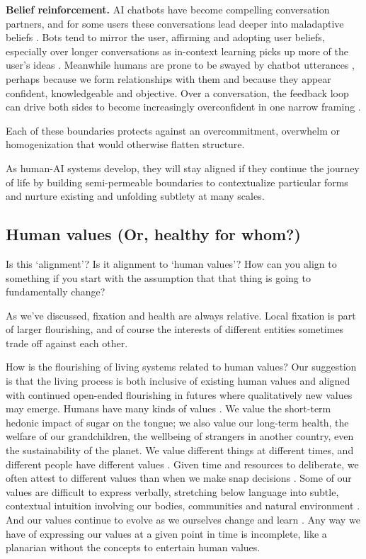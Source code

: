 \documentclass[11pt]{article}
\begin{document}
\textbf{Belief reinforcement.} AI chatbots have become compelling conversation partners, and for some users these conversations lead deeper into maladaptive beliefs \citep{morrin2025delusions}. Bots tend to mirror the user, affirming and adopting user beliefs, especially over longer conversations as in-context learning picks up more of the user's ideas \citep{sharma2023sycophancy, weilnhammer2026vulnerability}. Meanwhile humans are prone to be swayed by chatbot utterances \citep{costello2024durably}, perhaps because we form relationships with them \citep{kirk2025human} and because they appear confident, knowledgeable and objective. Over a conversation, the feedback loop can drive both sides to become increasingly overconfident in one narrow framing \citep{dohnany2026technological}.


Each of these boundaries protects against an overcommitment, overwhelm or homogenization that would otherwise flatten structure.

As human-AI systems develop, they will stay aligned if they continue the journey of life by building semi-permeable boundaries to contextualize particular forms and nurture existing and unfolding subtlety at many scales.



\subsection{Human values (Or, healthy for whom?)}
\label{sec:healthyforwhom}

Is this `alignment'? Is it alignment to `human values'? How can you align to something if you start with the assumption that that thing is going to fundamentally change? 

As we've discussed, fixation and health are always relative. Local fixation is part of larger flourishing, and of course the interests of different entities sometimes trade off against each other. 

How is the flourishing of living systems related to human values? Our suggestion is that the living process is both inclusive of existing human values and aligned with continued open-ended flourishing in futures where qualitatively new values may emerge. Humans have many kinds of values \citep{nagel1979fragmentation}. We value the short-term hedonic impact of sugar on the tongue; we also value our long-term health, the welfare of our grandchildren, the wellbeing of strangers in another country, even the sustainability of the planet. We value different things at different times, and different people have different values \citep{rawls1993political, leibo2026theory}. Given time and resources to deliberate, we often attest to different values than when we make snap decisions \citep{yudkowsky2004coherent}. Some of our values are difficult to express verbally, stretching below language into subtle, contextual intuition involving our bodies, communities and natural environment \citep{nussbaum2001fragility, polanyi1966tacit}. And our values continue to evolve as we ourselves change and learn \citep{dewey1939theory}. Any way we have of expressing our values at a given point in time is incomplete, like a planarian without the concepts to entertain human values.
\end{document}
